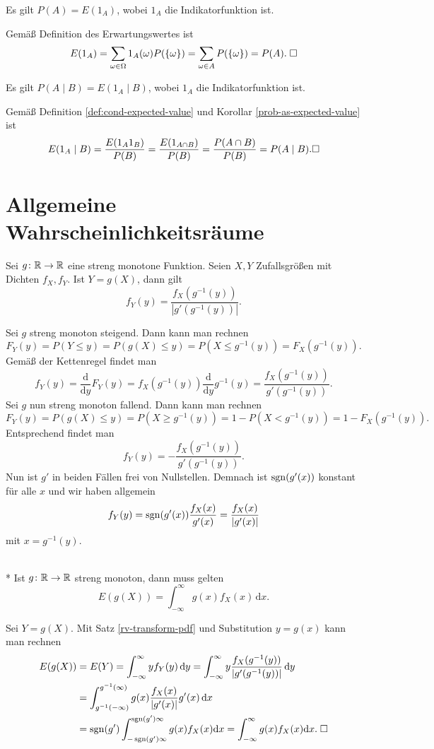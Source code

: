 \begin{Korollar}\label{prob-as-expected-value}
Es gilt $P(A) = E(1_A)$, wobei $1_A$ die Indikatorfunktion ist.
\end{Korollar}
 Gemäß Definition des Erwartungswertes ist
\[E(1_A) = \sum_{\omega\in\Omega} 1_A(\omega)P(\{\omega\})
= \sum_{\omega\in A}P(\{\omega\}) = P(A).\;\square\]

\begin{Korollar}
Es gilt $P(A\mid B) = E(1_A\mid B)$, wobei $1_A$ die Indikatorfunktion ist.
\end{Korollar}
 Gemäß Definition \ref{def:cond-expected-value}
und Korollar \ref{prob-as-expected-value} ist
\[E(1_A\mid B) = \frac{E(1_A 1_B)}{P(B)} = \frac{E(1_{A\cap B})}{P(B)}
= \frac{P(A\cap B)}{P(B)} = P(A\mid B).\square\]

\section{Allgemeine Wahrscheinlichkeitsräume}

\begin{Satz}\label{rv-transform-pdf}
Sei $g\colon\mathbb R\to\mathbb R$ eine streng monotone Funktion. Seien
$X,Y$ Zufallsgrößen mit Dichten $f_X,f_Y$. Ist $Y=g(X)$,
dann gilt
\[f_Y(y) = \frac{f_X(g^{-1}(y))}{|g'(g^{-1}(y))|}.\]
\end{Satz}
 Sei $g$ streng monoton steigend. Dann kann man rechnen
\[F_Y(y) = P(Y\le y) = P(g(X)\le y) = P(X\le g^{-1}(y)) = F_X(g^{-1}(y)).\]
Gemäß der Kettenregel findet man
\[f_Y(y) = \frac{\mathrm d}{\mathrm dy}F_Y(y)
= f_X(g^{-1}(y))\frac{\mathrm d}{\mathrm dy}g^{-1}(y) = \frac{f_X(g^{-1}(y))}{g'(g^{-1}(y))}.\]
Sei $g$ nun streng monoton fallend. Dann kann man rechnen
\[F_Y(y) = P(g(X)\le y) = P(X\ge g^{-1}(y)) = 1 - P(X < g^{-1}(y))
= 1 - F_X(g^{-1}(y)).\]
Entsprechend findet man
\[f_Y(y) = -\frac{f_X(g^{-1}(y))}{g'(g^{-1}(y))}.\]
Nun ist $g'$ in beiden Fällen frei von Nullstellen. Demnach ist
$\operatorname{sgn}(g'(x))$ konstant für alle $x$ und wir haben allgemein
\[f_Y(y) = \operatorname{sgn}(g'(x))\frac{f_X(x)}{g'(x)} = \frac{f_X(x)}{|g'(x)|}\]
mit $x=g^{-1}(y)$.\;\qedsymbol

\begin{Satz}\mbox{}\\*
Ist $g\colon\mathbb R\to\mathbb R$ streng monoton, dann muss gelten
\[E(g(X)) = \int_{-\infty}^\infty g(x)f_X(x)\,\mathrm dx.\]
\end{Satz}
 Sei $Y=g(X)$. Mit Satz \ref{rv-transform-pdf}
und Substitution $y=g(x)$ kann man rechnen
\begin{align*}
E(g(X)) &= E(Y) = \int_{-\infty}^\infty yf_Y(y)\,\mathrm dy
= \int_{-\infty}^\infty y\frac{f_X(g^{-1}(y))}{|g'(g^{-1}(y))|}\,\mathrm dy\\
&= \int_{g^{-1}(-\infty)}^{g^{-1}(\infty)} g(x)
\frac{f_X(x)}{|g'(x)|}g'(x)\,\mathrm dx\\
&= \operatorname{sgn}(g')\int_{-\operatorname{sgn}(g')\infty}^{\operatorname{sgn}(g')\infty}g(x) f_X(x)\mathrm dx
= \int_{-\infty}^\infty g(x) f_X(x)\mathrm dx.\;\square
\end{align*}

